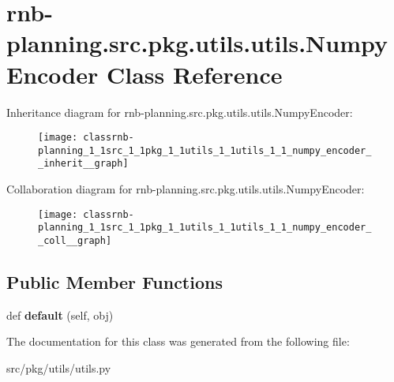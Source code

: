 \hypertarget{classrnb-planning_1_1src_1_1pkg_1_1utils_1_1utils_1_1_numpy_encoder}{}\section{rnb-\/planning.src.\+pkg.\+utils.\+utils.\+Numpy\+Encoder Class Reference}
\label{classrnb-planning_1_1src_1_1pkg_1_1utils_1_1utils_1_1_numpy_encoder}


Inheritance diagram for rnb-\/planning.src.\+pkg.\+utils.\+utils.\+Numpy\+Encoder\+:
\nopagebreak
\begin{figure}[H]
\begin{center}
\leavevmode
\texttt{[image: classrnb-planning\_1\_1src\_1\_1pkg\_1\_1utils\_1\_1utils\_1\_1\_numpy\_encoder\_\_inherit\_\_graph]}
\end{center}
\end{figure}


Collaboration diagram for rnb-\/planning.src.\+pkg.\+utils.\+utils.\+Numpy\+Encoder\+:
\nopagebreak
\begin{figure}[H]
\begin{center}
\leavevmode
\texttt{[image: classrnb-planning\_1\_1src\_1\_1pkg\_1\_1utils\_1\_1utils\_1\_1\_numpy\_encoder\_\_coll\_\_graph]}
\end{center}
\end{figure}
\subsection*{Public Member Functions}
\begin{DoxyCompactItemize}
\item 
\mbox{\label{classrnb-planning_1_1src_1_1pkg_1_1utils_1_1utils_1_1_numpy_encoder_a356086ad2d0e5d2249196f3b5e391722}} 
def {\bfseries default} (self, obj)
\end{DoxyCompactItemize}


The documentation for this class was generated from the following file\+:\begin{DoxyCompactItemize}
\item 
src/pkg/utils/utils.\+py\end{DoxyCompactItemize}
